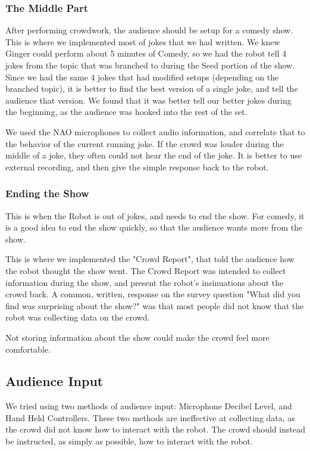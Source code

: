     \subsubsection{The Middle Part}

    After performing crowdwork, the audience should be setup for a comedy show. This is where we implemented most of jokes that we had written.
    We knew Ginger could perform about 5 minutes of Comedy, so we had the robot tell 4 jokes from the topic that was branched to during the Seed portion of the show.
    Since we had the same 4 jokes that had modified setups (depending on the branched topic), it is better to find the best version of a single joke, and tell the audience that version. We found that it was better tell our better jokes during the beginning, as the audience was hooked into the rest of the set.

    We used the NAO microphones to collect audio information, and correlate that to the behavior of the current running joke.
    If the crowd was louder during the middle of a joke, they often could not hear the end of the joke.
    It is better to use external recording, and then give the simple response back to the robot.

    \subsubsection{Ending the Show}

    This is when the Robot is out of jokes, and needs to end the show.
    For comedy, it is a good idea to end the show quickly, so that the audience wants more from the show.

    This is where we implemented the "Crowd Report", that told the audience how the robot thought the show went.
    The Crowd Report was intended to collect information during the show, and present the robot's insinuations about the crowd back.
    A common, written, response on the survey question "What did you find was surprising about the show?" was that most people did not know that the robot was collecting data on the crowd.


    Not storing information about the show could make the crowd feel more comfortable.


\subsection{Audience Input}
    We tried using two methods of audience input: Microphone Decibel Level, and Hand Held Controllers.
    These two methods are ineffective at collecting data, as the crowd did not know how to interact with the robot.
    The crowd should instead be instructed, as simply as possible, how to interact with the robot.


